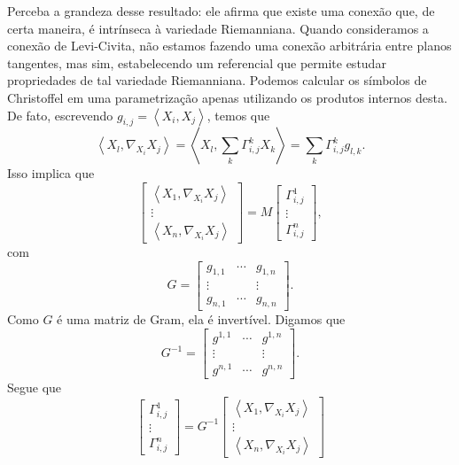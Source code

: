 Perceba a grandeza desse resultado: ele afirma que existe uma conexão que, de certa maneira, é intrínseca à variedade Riemanniana. Quando consideramos a conexão de Levi-Civita, não estamos fazendo uma conexão arbitrária entre planos tangentes, mas sim, estabelecendo um referencial que permite estudar propriedades de tal variedade Riemanniana.
Podemos calcular os símbolos de Christoffel em uma parametrização apenas utilizando os produtos internos desta. De fato, escrevendo $g_{i,j}=\left<X_{i},X_{j}\right>$, temos que
\begin{equation*}
	\left<X_{l},\nabla_{X_{i}}X_{j}\right> = \left<X_{l},\sum_{k}\Gamma_{i,j}^{k}X_{k}\right>= \sum_{k}\Gamma_{i,j}^{k}g_{l,k}  .
\end{equation*}
Isso implica que
\begin{equation*}
	\begin{bmatrix}
		\left<X_{1},\nabla_{X_{i}}X_{j}\right> \\
		\vdots                                 \\
		\left<X_{n},\nabla_{X_{i}}X_{j}\right>
	\end{bmatrix} =
	M
	\begin{bmatrix}
		\Gamma_{i,j}^{1} \\
		\vdots           \\
		\Gamma_{i,j}^{n}
	\end{bmatrix},
\end{equation*}
com
\begin{equation*}
	G = \begin{bmatrix}
		g_{1,1} & \cdots & g_{1,n} \\
		\vdots  &        & \vdots  \\
		g_{n,1} & \cdots & g_{n,n}
	\end{bmatrix}.
\end{equation*}
Como $G$ é uma matriz de Gram, ela é invertível. Digamos que
\begin{equation*}
	G^{-1} = \begin{bmatrix}
		g^{1,1} & \cdots & g^{1,n} \\
		\vdots  &        & \vdots  \\
		g^{n,1} & \cdots & g^{n,n}
	\end{bmatrix}.
\end{equation*}
Segue que
\begin{equation*}
	\begin{bmatrix}
		\Gamma_{i,j}^{1} \\
		\vdots           \\
		\Gamma_{i,j}^{n}
	\end{bmatrix}=
	G^{-1}
	\begin{bmatrix}
		\left<X_{1},\nabla_{X_{i}}X_{j}\right> \\
		\vdots                                 \\
		\left<X_{n},\nabla_{X_{i}}X_{j}\right>
	\end{bmatrix}
\end{equation*}
